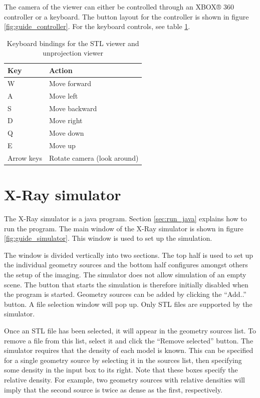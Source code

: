 The camera of the viewer can either be controlled through an XBOX® 360 controller or a keyboard. The button layout for the controller is shown in figure \ref{fig:guide_controller}. For the keyboard controls, see table \ref{table:guide_controls}.

\begin{table}[!htb]
\centering
\begin{tabular}{|l|l|}
\hline
\textbf{Key} & \textbf{Action} \\
\hline
W & Move forward	\\
A & Move left		\\
S & Move backward	\\
D & Move right		\\
Q & Move down		\\
E & Move up			\\
Arrow keys   & Rotate camera (look around) \\
\hline
\end{tabular}
\caption{Keyboard bindings for the STL viewer and unprojection viewer}
\label{table:guide_controls}
\end{table}

\section{X-Ray simulator}

The X-Ray simulator is a java program. Section \ref{sec:run_java} explains how to run the program. The main window of the X-Ray simulator is shown in figure \ref{fig:guide_simulator}. This window is used to set up the simulation.

The window is divided vertically into two sections. The top half is used to set up the individual geometry sources and the bottom half configures amongst others the setup of the imaging. The simulator does not allow simulation of an empty scene. The button that starts the simulation is therefore initially disabled when the program is started. Geometry sources can be added by clicking the ``Add..'' button. A file selection window will pop up. Only STL files are supported by the simulator.

Once an STL file has been selected, it will appear in the geometry sources list. To remove a file from this list, select it and click the ``Remove selected'' button. The simulator requires that the density of each model is known. This can be specified for a single geometry source by selecting it in the sources list, then specifying some density in the input box to its right. Note that these boxes specify the relative density. For example, two geometry sources with relative densities will imply that the second source is twice as dense as the first, respectively.

